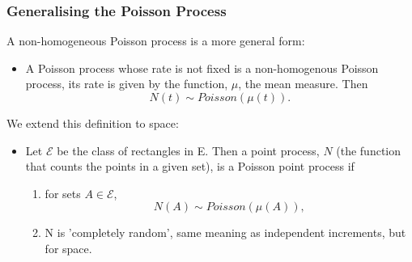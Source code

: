 \documentclass{beamer}
\begin{document}
\begin{frame}
  \frametitle{Generalising the Poisson Process}
  A non-homogeneous Poisson process is a more general form:
  \begin{itemize}
  \item A Poisson process whose rate is not fixed is a non-homogenous Poisson process, its rate is given by the function, $\mu$, the mean measure. Then
    $$N(t) \sim Poisson(\mu (t)).$$
  \end{itemize}

  \pause

  We extend this definition to space:
  \begin{itemize}
    \item Let $\mathcal{E}$ be the class of rectangles in E. Then a point process, $N$ (the function that counts the points in a given set), is a Poisson point process if
    \begin{enumerate} 
      \item for sets $A \in \mathcal{E}$, $$N(A) \sim Poisson(\mu(A)),$$
      \item N is 'completely random', same meaning as independent increments, but for space.
    \end{enumerate}
  \end{itemize}
\end{frame}
\end{document}
